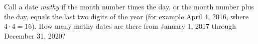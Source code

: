 Call a date \emph{mathy} if the month number times the day, or the month number plus the day, equals the last two digits of the year (for example April 4, 2016, where $4\cdot4=16$). How many mathy dates are there from January 1, 2017 through December 31, 2020?
